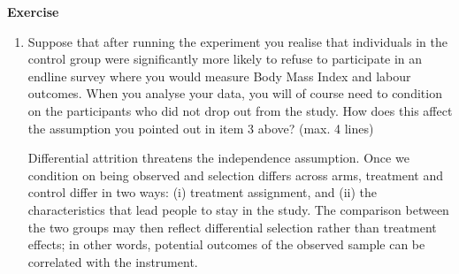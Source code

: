 \documentclass[10pt]{article}
\newcounter{exercise}
\newenvironment{exercise}%
{%
	\refstepcounter{exercise}%
	\textbf{Exercise \theexercise}%
	}%
{
 \par\vspace{\baselineskip}%
\noindent\ignorespacesafterend
}
\begin{document}
\begin{exercise}
\begin{enumerate}
		\color{red}
		Randomisation guarantees independence only. The first stage can be tested in the data, while the exclusion restriction and monotonicity have to be argued for.
		\color{black}
		\item Suppose that after running the experiment you realise that individuals in the control group were significantly more likely to refuse to participate in an endline survey where you would measure Body Mass Index and labour outcomes. When you analyse your data, you will of course need to condition on the participants who did not drop out from the study. How does this affect the assumption you pointed out in item 3 above? (max. 4 lines)

		\color{red}
		Differential attrition threatens the independence assumption. Once we condition on being observed and selection differs across arms, treatment and control differ in two ways: (i) treatment assignment, and (ii) the characteristics that lead people to stay in the study. The comparison between the two groups may then reflect differential selection rather than treatment effects; in other words, potential outcomes of the observed sample can be correlated with the instrument.
		\color{black}
	\end{enumerate}
\end{exercise}

\end{document}

